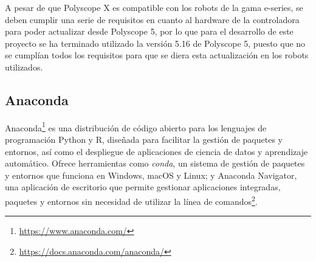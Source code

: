 

A pesar de que Polyscope X es compatible con los robots de la gama e-series, se deben cumplir una serie de requisitos en cuanto al hardware de la controladora para poder actualizar desde Polyscope 5, por lo que para el desarrollo de este proyecto se ha terminado utilizado la versión 5.16 de Polyscope 5, puesto que no se cumplían todos los requisitos para que se diera esta actualización en los robots utilizados.


\subsection{Anaconda}
\label{sec:Anaconda}

Anaconda\footnote{\url{https://www.anaconda.com/}} es una distribución de código abierto para los lenguajes de programación Python y R, diseñada para facilitar la gestión de paquetes y entornos, así como el despliegue de aplicaciones de ciencia de datos y aprendizaje automático. Ofrece herramientas como \textit{conda}, un sistema de gestión de paquetes y entornos que funciona en Windows, macOS y Linux; y Anaconda Navigator, una aplicación de escritorio que permite gestionar aplicaciones integradas, paquetes y entornos sin necesidad de utilizar la línea de comandos\footnote{\url{https://docs.anaconda.com/anaconda/}}.

